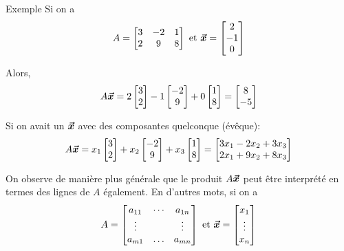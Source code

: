 \documentclass{article}
\begin{document}
\begin{parag}{Exemple}
    Si on a
    \[A = \begin{bmatrix} 3 & -2 & 1 \\ 2 & 9 & 8 \end{bmatrix} \text{ et } \bm{\protect\vec{x}} = \begin{bmatrix} 2 \\ -1 \\ 0 \end{bmatrix} \]

    Alors,
    \[A \bm{\protect\vec{x}} = 2\begin{bmatrix} 3 \\ 2 \end{bmatrix} - 1 \begin{bmatrix} -2 \\ 9 \end{bmatrix} + 0 \begin{bmatrix} 1 \\ 8 \end{bmatrix} = \begin{bmatrix} 8 \\ -5 \end{bmatrix} \]

    Si on avait un $\bm{\protect\vec{x}}$ avec des composantes quelconque (évêque):
    \[A \bm{\protect\vec{x}} = x_1 \begin{bmatrix} 3 \\ 2 \end{bmatrix} + x_2 \begin{bmatrix} -2 \\ 9 \end{bmatrix} + x_3 \begin{bmatrix} 1 \\ 8 \end{bmatrix} = \begin{bmatrix} 3x_1 -2x_2 + 3x_3 \\ 2x_1 + 9x_2 + 8x_3 \end{bmatrix} \]

    On observe de manière plus générale que le produit $A \bm{\protect\vec{x}}$ peut être interprété en termes des lignes de $A$ également. En d'autres mots, si on a
    \[A = \begin{bmatrix} a_{11} & \cdots & a_{1n} \\ \vdots &  & \vdots \\ a_{m1} & \ldots & a_{mn} \end{bmatrix} \text{ et } \bm{\protect\vec{x}} = \begin{bmatrix} x_1 \\ \vdots \\ x_n \end{bmatrix} \]


\end{parag}
\end{document}
